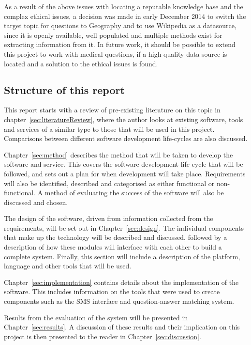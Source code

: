 \documentclass{article}
\begin{document}
As a result of the above issues with locating a reputable knowledge base and the complex ethical issues, a decision was made in early December 2014 to switch the target topic for questions to Geography and to use Wikipedia as a datasource, since it is openly available, well populated and multiple methods exist for extracting information from it.  In future work, it should be possible to extend this project to work with medical questions, if a high quality data-source is located and a solution to the ethical issues is found.

\subsection{Structure of this report}
This report starts with a review of pre-existing literature on this topic in chapter~\ref{sec:literatureReview}, where the author looks at existing software, tools and services of a similar type to those that will be used in this project.  Comparisons between different software development life-cycles are also discussed.

Chapter~\ref{sec:method} describes the method that will be taken to develop the software and service.  This covers the software development life-cycle that will be followed, and sets out a plan for when development will take place.  Requirements will also be identified, described and categorised  as either functional or non-functional.  A method of evaluating the success of the software will also be discussed and chosen.

The design of the software, driven from information collected from the requirements, will be set out in Chapter~\ref{sec:design}.  The individual components that make up the technology will be described and discussed, followed by a description of how these modules will interface with each other to build a complete system.  Finally, this section will include a description of the platform, language and other tools that will be used.

Chapter~\ref{sec:implementation} contains details about the implementation of the software.  This includes information on the tools that were used to create components such as the SMS interface and question-answer matching system.

Results from the evaluation of the system will be presented in Chapter~\ref{sec:results}.  A discussion of these results and their implication on this project is then presented to the reader in Chapter~\ref{sec:discussion}.
\end{document}
